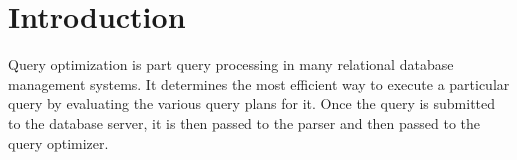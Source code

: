 
\section{Introduction}
\label{sec:intro}


Query optimization is part query processing in many relational database management systems. It determines the most efficient way to execute a particular query by evaluating the various query plans for it. Once the query is submitted to the database server, it is then passed to the parser and then passed to the query optimizer.
